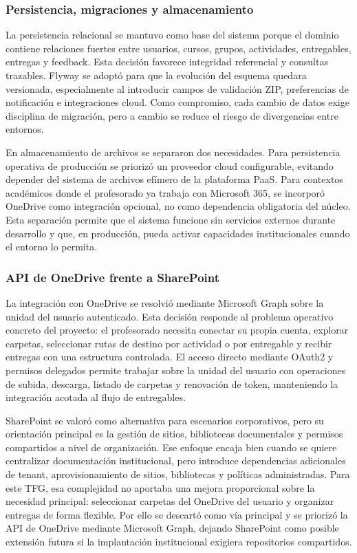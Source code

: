 \subsubsection*{Persistencia, migraciones y almacenamiento}

La persistencia relacional se mantuvo como base del sistema porque el dominio contiene relaciones fuertes entre usuarios, cursos, grupos, actividades, entregables, entregas y feedback. Esta decisi\'on favorece integridad referencial y consultas trazables. Flyway se adopt\'o para que la evoluci\'on del esquema quedara versionada, especialmente al introducir campos de validaci\'on ZIP, preferencias de notificaci\'on e integraciones cloud. Como compromiso, cada cambio de datos exige disciplina de migraci\'on, pero a cambio se reduce el riesgo de divergencias entre entornos.

En almacenamiento de archivos se separaron dos necesidades. Para persistencia operativa de producci\'on se prioriz\'o un proveedor cloud configurable, evitando depender del sistema de archivos ef\'imero de la plataforma PaaS. Para contextos acad\'emicos donde el profesorado ya trabaja con Microsoft 365, se incorpor\'o OneDrive como integraci\'on opcional, no como dependencia obligatoria del n\'ucleo. Esta separaci\'on permite que el sistema funcione sin servicios externos durante desarrollo y que, en producci\'on, pueda activar capacidades institucionales cuando el entorno lo permita.

\subsubsection*{API de OneDrive frente a SharePoint}

La integraci\'on con OneDrive se resolvi\'o mediante Microsoft Graph sobre la unidad del usuario autenticado. Esta decisi\'on responde al problema operativo concreto del proyecto: el profesorado necesita conectar su propia cuenta, explorar carpetas, seleccionar rutas de destino por actividad o por entregable y recibir entregas con una estructura controlada. El acceso directo mediante OAuth2 y permisos delegados permite trabajar sobre la unidad del usuario con operaciones de subida, descarga, listado de carpetas y renovaci\'on de token, manteniendo la integraci\'on acotada al flujo de entregables.

SharePoint se valor\'o como alternativa para escenarios corporativos, pero su orientaci\'on principal es la gesti\'on de sitios, bibliotecas documentales y permisos compartidos a nivel de organizaci\'on. Ese enfoque encaja bien cuando se quiere centralizar documentaci\'on institucional, pero introduce dependencias adicionales de tenant, aprovisionamiento de sitios, bibliotecas y pol\'iticas administradas. Para este TFG, esa complejidad no aportaba una mejora proporcional sobre la necesidad principal: seleccionar carpetas del OneDrive del usuario y organizar entregas de forma flexible. Por ello se descart\'o como v\'ia principal y se prioriz\'o la API de OneDrive mediante Microsoft Graph, dejando SharePoint como posible extensi\'on futura si la implantaci\'on institucional exigiera repositorios compartidos.

